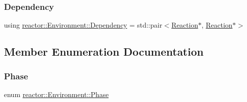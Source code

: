 \subsubsection{\texorpdfstring{Dependency}{Dependency}}
{\footnotesize\ttfamily using \hyperlink{classreactor_1_1Environment_aefeb24b3f7a321c7dc8309cac1ed176d}{reactor\+::\+Environment\+::\+Dependency} =  std\+::pair$<$\hyperlink{classreactor_1_1Reaction}{Reaction}$\ast$, \hyperlink{classreactor_1_1Reaction}{Reaction}$\ast$$>$\hspace{0.3cm}{\ttfamily [private]}}



\subsection{Member Enumeration Documentation}
\mbox{\label{classreactor_1_1Environment_a2f0bcf10490e174246fc14b456fb0755}} 
\subsubsection{\texorpdfstring{Phase}{Phase}}
{\footnotesize\ttfamily enum \hyperlink{classreactor_1_1Environment_a2f0bcf10490e174246fc14b456fb0755}{reactor\+::\+Environment\+::\+Phase}\hspace{0.3cm}{\ttfamily [strong]}}

